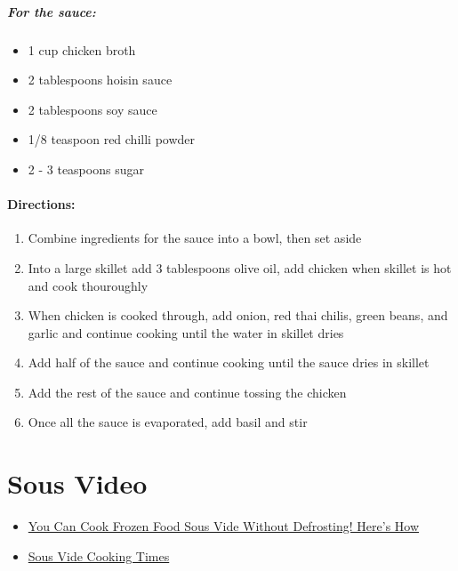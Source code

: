 \documentclass[]{article}
\providecommand{\tightlist}{%
  \setlength{\itemsep}{0pt}\setlength{\parskip}{0pt}}
\begin{document}
\hypertarget{for-the-sauce}{%
\subsubsection{For the sauce:}\label{for-the-sauce}}

\begin{itemize}
\tightlist
\item
  1 cup chicken broth
\item
  2 tablespoons hoisin sauce
\item
  2 tablespoons soy sauce
\item
  1/8 teaspoon red chilli powder
\item
  2 - 3 teaspoons sugar
\end{itemize}

\hypertarget{directions}{%
\subsection{Directions:}\label{directions}}

\begin{enumerate}
\def\labelenumi{\arabic{enumi}.}
\tightlist
\item
  Combine ingredients for the sauce into a bowl, then set aside
\item
  Into a large skillet add 3 tablespoons olive oil, add chicken when skillet is hot and cook thouroughly
\item
  When chicken is cooked through, add onion, red thai chilis, green beans, and garlic and continue cooking until the water in skillet dries
\item
  Add half of the sauce and continue cooking until the sauce dries in skillet
\item
  Add the rest of the sauce and continue tossing the chicken
\item
  Once all the sauce is evaporated, add basil and stir
\end{enumerate}

\hypertarget{part-sous-video}{%
\part{Sous Video}\label{part-sous-video}}

\begin{itemize}
\tightlist
\item
  \href{https://www.chefsteps.com/activities/you-can-cook-frozen-food-sous-vide-without-defrosting-here-s-how}{You Can Cook Frozen Food Sous Vide Without Defrosting! Here's How}
\item
  \href{https://www.chefsteps.com/activities/sous-vide-time-and-temperature-guide}{Sous Vide Cooking Times}
\end{itemize}
\end{document}
